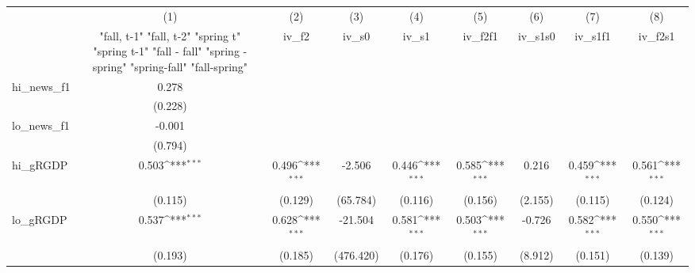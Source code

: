 {
\def\sym#1{\ifmmode^{#1}\else\(^{#1}\)\fi}
\begin{tabular}{l*{8}{c}}
\toprule
            &\multicolumn{1}{c}{(1)}&\multicolumn{1}{c}{(2)}&\multicolumn{1}{c}{(3)}&\multicolumn{1}{c}{(4)}&\multicolumn{1}{c}{(5)}&\multicolumn{1}{c}{(6)}&\multicolumn{1}{c}{(7)}&\multicolumn{1}{c}{(8)}\\
            &\multicolumn{1}{c}{  "fall, t-1" "fall, t-2" "spring t" "spring t-1"  "fall - fall" "spring - spring" "spring-fall" "fall-spring" }&\multicolumn{1}{c}{iv\_f2}&\multicolumn{1}{c}{iv\_s0}&\multicolumn{1}{c}{iv\_s1}&\multicolumn{1}{c}{iv\_f2f1}&\multicolumn{1}{c}{iv\_s1s0}&\multicolumn{1}{c}{iv\_s1f1}&\multicolumn{1}{c}{iv\_f2s1}\\
\midrule
hi\_news\_f1  &       0.278         &                     &                     &                     &                     &                     &                     &                     \\
            &     (0.228)         &                     &                     &                     &                     &                     &                     &                     \\
\addlinespace
lo\_news\_f1  &      -0.001         &                     &                     &                     &                     &                     &                     &                     \\
            &     (0.794)         &                     &                     &                     &                     &                     &                     &                     \\
\addlinespace
hi\_gRGDP    &       0.503\sym{***}&       0.496\sym{***}&      -2.506         &       0.446\sym{***}&       0.585\sym{***}&       0.216         &       0.459\sym{***}&       0.561\sym{***}\\
            &     (0.115)         &     (0.129)         &    (65.784)         &     (0.116)         &     (0.156)         &     (2.155)         &     (0.115)         &     (0.124)         \\
\addlinespace
lo\_gRGDP    &       0.537\sym{***}&       0.628\sym{***}&     -21.504         &       0.581\sym{***}&       0.503\sym{***}&      -0.726         &       0.582\sym{***}&       0.550\sym{***}\\
            &     (0.193)         &     (0.185)         &   (476.420)         &     (0.176)         &     (0.155)         &     (8.912)         &     (0.151)         &     (0.139)         \\

\end{tabular}}
